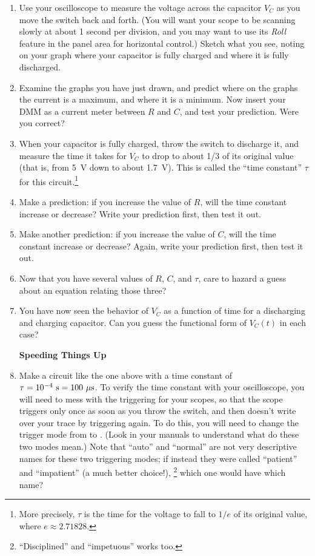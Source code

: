 \begin{enumerate}[wide]
\item Use your oscilloscope to measure the voltage across the capacitor $V_C$ as you move the switch back and forth.  (You will want your scope to be scanning slowly at about 1 second per division, and you may want to use its \textsl{Roll} feature in the panel area for horizontal control.)  Sketch what you see, noting on your graph where your capacitor is fully charged and where it is fully discharged.   

\item Examine the graphs you have just drawn, and predict where on the graphs the current is a maximum, and where it is a minimum.  Now insert your DMM as a current meter between $R$ and $C$, and test your prediction.  Were you correct?

\item When your capacitor is fully charged, throw the switch to discharge it, and measure the time it takes for $V_C$ to drop to about 1/3 of its original value (that is, from 5~V down to about 1.7~V).  This is called the ``time constant'' $\tau$ for this circuit.\footnote{More precisely, $\tau$ is the time for the voltage to fall to $1/e$ of its original value, where $e \approx 2.71828$.}

\item Make a prediction: if you increase the value of $R$, will the time constant increase or decrease?  Write your prediction first, then test it out.

\item Make another prediction: if you increase the value of $C$, will the time constant increase or decrease?  Again, write your prediction first, then test it out.

\item Now that you have several values of $R$, $C$, and $\tau$, care to hazard a guess about an equation relating those three?

\item You have now seen the behavior of $V_C$ as a function of time for a discharging and charging capacitor.  Can you guess the functional form of $V_C(t)$ in each case?

\pagebreak[3]
\textbf{Speeding Things Up}

\item Make a circuit like the one above with a time constant of $\tau=10^{-4}~{\rm s} = 100~\mu {\rm s}$.   
To verify the time constant with your oscilloscope, you will need to mess with the triggering for your scopes, so that the scope triggers only once as soon as you throw the switch, and then doesn't write over your trace by triggering again.  To do this, you will need to change the trigger mode from  to .  (Look in your manuals to understand what do these two modes mean.)  Note that ``auto'' and ``normal'' are not very descriptive names for these two triggering modes; if instead they were called ``patient'' and ``impatient'' (a much better choice!),%
\footnote{``Disciplined'' and ``impetuous'' works too.}
which one would have which name?


\end{enumerate}
